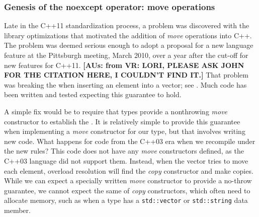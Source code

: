 \subsubsection[Genesis of the \lstinline!noexcept! operator: move operations]{Genesis of the {\SubsubsecCode noexcept} operator: move operations}\label{genesis-of-the-noexcept-operator:-move-operations}

Late in the C++11 standardization process, a problem was discovered with
the library optimizations that motivated the addition of \emph{move}
operations into C++. The problem was deemed serious enough to adopt a
proposal for a new language feature at the Pittsburgh meeting, March
2010, over a year after the cut-off for new features for C++11. \textbf{[AUs: from VR: LORI, 
PLEASE ASK JOHN FOR THE CITATION HERE, I COULDN'T FIND IT.]} That problem
was breaking the  when
inserting an element into a vector; see . Much code has
been written and tested expecting this guarantee to hold.

A simple fix would be to require that types provide a nonthrowing
\emph{move} constructor to establish the . It is relatively simple to provide this guarantee when
implementing a \emph{move} constructor for our type, but that involves
writing new code. What happens for code from the C++03 era when we
recompile under the new rules? This code does not have any \emph{move}
constructors defined, as the C++03 language did not support them.
Instead, when the vector tries to move each element, overload resolution
will find the \emph{copy} constructor and make copies. While we can
expect a specially written \emph{move} constructor to provide a no-throw
guarantee, we cannot expect the same of \emph{copy} constructors, which
often need to allocate memory, such as when a type has a
\lstinline!std::vector! or \lstinline!std::string! data member.

